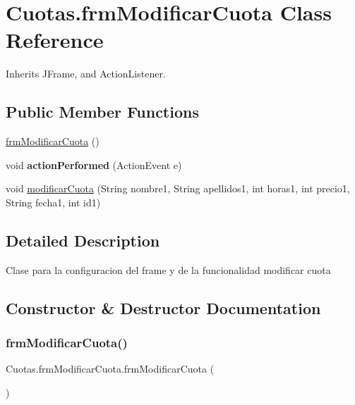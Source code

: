 \hypertarget{class_cuotas_1_1frm_modificar_cuota}{}\section{Cuotas.\+frm\+Modificar\+Cuota Class Reference}
\label{class_cuotas_1_1frm_modificar_cuota}


Inherits J\+Frame, and Action\+Listener.

\subsection*{Public Member Functions}
\begin{DoxyCompactItemize}
\item 
\hyperlink{class_cuotas_1_1frm_modificar_cuota_a575b442c7115024af8ecf1037d589454}{frm\+Modificar\+Cuota} ()
\item 
\mbox{\label{class_cuotas_1_1frm_modificar_cuota_a0869258ad0f43bd4f50d8e0ff538db20}} 
void {\bfseries action\+Performed} (Action\+Event e)
\item 
void \hyperlink{class_cuotas_1_1frm_modificar_cuota_a2f53e2686e069b5a558086fb5e6893d9}{modificar\+Cuota} (String nombre1, String apellidos1, int horas1, int precio1, String fecha1, int id1)
\end{DoxyCompactItemize}


\subsection{Detailed Description}
Clase para la configuracion del frame y de la funcionalidad modificar cuota 

\subsection{Constructor \& Destructor Documentation}
\mbox{\label{class_cuotas_1_1frm_modificar_cuota_a575b442c7115024af8ecf1037d589454}} 
\subsubsection{\texorpdfstring{frm\+Modificar\+Cuota()}{frmModificarCuota()}}
{\footnotesize\ttfamily Cuotas.\+frm\+Modificar\+Cuota.\+frm\+Modificar\+Cuota (\begin{DoxyParamCaption}{ }\end{DoxyParamCaption})}

